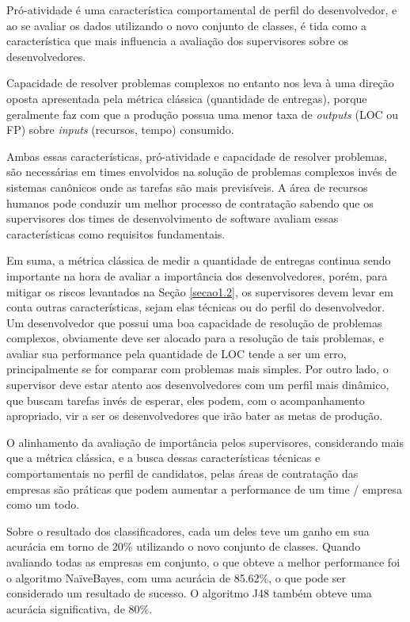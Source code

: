 Pró-atividade é uma característica comportamental de perfil do desenvolvedor,  e ao se avaliar os dados utilizando o novo conjunto de classes, é tida como a característica que mais influencia a avaliação dos supervisores sobre os desenvolvedores.

Capacidade de resolver problemas complexos no entanto nos leva à uma direção oposta apresentada pela métrica clássica (quantidade de entregas), porque geralmente faz com que a produção possua uma menor taxa de \textit{outputs} (LOC ou FP) sobre \textit{inputs} (recursos, tempo) consumido.

Ambas essas características, pró-atividade e capacidade de resolver problemas, são necessárias em times envolvidos na solução de problemas complexos invés de sistemas canônicos onde as tarefas são mais previsíveis. A área de recursos humanos pode conduzir um melhor processo de contratação sabendo que os supervisores dos times de desenvolvimento de software avaliam essas características como requisitos fundamentais.

Em suma, a métrica clássica de medir a quantidade de entregas continua sendo importante na hora de avaliar a importância dos desenvolvedores, porém, para mitigar os riscos levantados na Seção \ref{secao1.2}, os supervisores devem levar em conta outras características, sejam elas técnicas ou do perfil do desenvolvedor. Um desenvolvedor que possui uma boa capacidade de resolução de problemas complexos, obviamente deve ser alocado para a resolução de tais problemas, e avaliar sua performance pela quantidade de LOC tende a ser um erro, principalmente se for comparar com problemas mais simples. Por outro lado, o supervisor deve estar atento aos desenvolvedores com um perfil mais dinâmico, que buscam tarefas invés de esperar, eles podem, com o acompanhamento apropriado, vir a ser os desenvolvedores que irão bater as metas de produção.

O alinhamento da avaliação de importância pelos supervisores, considerando mais que a métrica clássica, e a busca dessas características técnicas e comportamentais no perfil de candidatos, pelas áreas de contratação das empresas são práticas que podem aumentar a performance de um time / empresa como um todo.

Sobre o resultado dos classificadores, cada um deles teve um ganho em sua acurácia em torno de 20\% utilizando o novo conjunto de classes. Quando avaliando todas as empresas em conjunto, o que obteve a melhor performance foi o algoritmo NaïveBayes, com uma acurácia de 85.62\%, o que pode ser considerado um resultado de sucesso. O algoritmo J48 também obteve uma acurácia significativa, de 80\%. 

